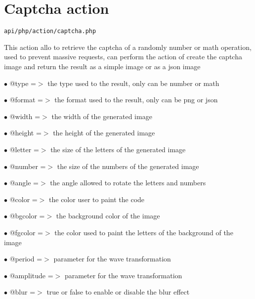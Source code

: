 \documentclass[a4paper]{book}
\begin{document}
\hypertarget{toc9}{}
\section{Captcha action}

\begin{lstlisting}
api/php/action/captcha.php
\end{lstlisting}

This action allo to retrieve the captcha of a randomly number or math
operation, used to prevent massive requests, can perform the action of
create the captcha image and return the result as a simple image or as
a json image

\begin{compactitem}
\item[\color{myblue}$\bullet$] @type   =$>$ the type used to the result, only can be number or math
\item[\color{myblue}$\bullet$] @format =$>$ the format used to the result, only can be png or json
\end{compactitem}

\begin{compactitem}
\item[\color{myblue}$\bullet$] @width     =$>$ the width of the generated image
\item[\color{myblue}$\bullet$] @height    =$>$ the height of the generated image
\item[\color{myblue}$\bullet$] @letter    =$>$ the size of the letters of the generated image
\item[\color{myblue}$\bullet$] @number    =$>$ the size of the numbers of the generated image
\item[\color{myblue}$\bullet$] @angle     =$>$ the angle allowed to rotate the letters and numbers
\item[\color{myblue}$\bullet$] @color     =$>$ the color user to paint the code
\item[\color{myblue}$\bullet$] @bgcolor   =$>$ the background color of the image
\item[\color{myblue}$\bullet$] @fgcolor   =$>$ the color used to paint the letters of the background of the image
\item[\color{myblue}$\bullet$] @period    =$>$ parameter for the wave transformation
\item[\color{myblue}$\bullet$] @amplitude =$>$ parameter for the wave transformation
\item[\color{myblue}$\bullet$] @blur      =$>$ true or false to enable or disable the blur effect
\end{compactitem}
\end{document}
